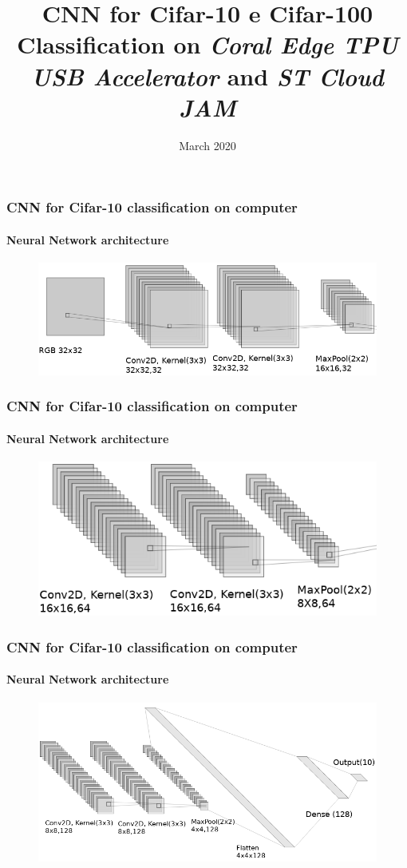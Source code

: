\documentclass{beamer}
\title{CNN for Cifar-10 e Cifar-100 Classification on \textit{Coral Edge TPU USB Accelerator} and \textit{ST Cloud JAM}}
\author
{}
\date{March 2020}
\begin{document}
\maketitle

\begin{frame}
\frametitle{CNN for Cifar-10 classification on computer}
\framesubtitle{Neural Network architecture}
\begin{figure}
	\centering
	\includegraphics[scale=0.4]{pictures/cnn1_crop_labels}
\end{figure}
\end{frame}

\begin{frame}
\frametitle{CNN for Cifar-10 classification on computer}
\framesubtitle{Neural Network architecture}
\begin{figure}
	\centering
	\includegraphics[scale=0.4]{pictures/cnn2_crop_labels}
\end{figure}
\end{frame}

\begin{frame}
\frametitle{CNN for Cifar-10 classification on computer}
\framesubtitle{Neural Network architecture}
\begin{figure}
	\centering
	\includegraphics[scale=0.4]{pictures/cnn3_crop_labels}
\end{figure}
\end{frame}
\end{document}
